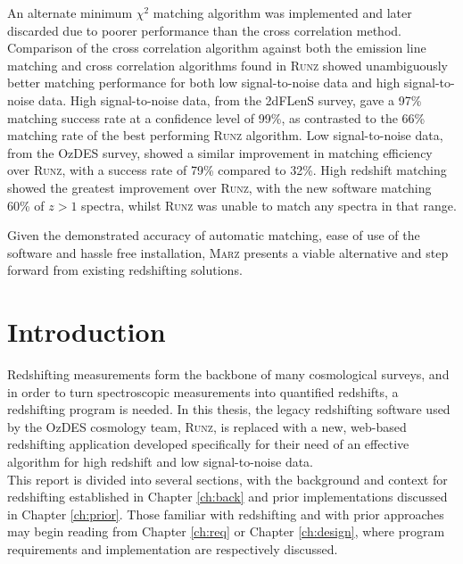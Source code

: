 \documentclass[titlesmallcaps, examinerscopy, copyrightpage]{uqthesis}
\newcommand{\thesisname}{\textsc{Marz}}
\newcommand{\runz}{\textsc{Runz}}
\begin{document}
An alternate minimum $\chi^2$ matching algorithm was implemented and later discarded due to poorer performance than the cross correlation method. Comparison of the cross correlation algorithm against both the emission line matching and cross correlation algorithms found in \runz{} showed unambiguously better matching performance for both low signal-to-noise data and high signal-to-noise data. High signal-to-noise data, from the 2dFLenS survey, gave a 97\% matching success rate at a confidence level of 99\%, as contrasted to the 66\% matching rate of the best performing \runz{} algorithm. Low signal-to-noise data, from the OzDES survey, showed a similar improvement in matching efficiency over \runz{}, with a success rate of 79\% compared to 32\%. High redshift matching showed the greatest improvement over \runz{}, with the new software matching 60\% of $z>1$ spectra, whilst \runz{} was unable to match any spectra in that range.

Given the demonstrated accuracy of automatic matching, ease of use of the software and hassle free installation, \thesisname{} presents a viable alternative and step forward from existing redshifting solutions.
\cleardoublepage
\hypersetup{pageanchor=true}

\tableofcontents
\listoffigures
\listoftables


\mainmatter


\chapter{Introduction}

Redshifting measurements form the backbone of many cosmological surveys, and in order to turn spectroscopic measurements into quantified redshifts, a redshifting program is needed. In this thesis, the legacy redshifting software used by the OzDES cosmology team, \runz{}, is replaced with a new, web-based redshifting application developed specifically for their need of an effective algorithm for high redshift and low signal-to-noise data.\\

This report is divided into several sections, with the background and context for redshifting established in Chapter \ref{ch:back} and prior implementations discussed in Chapter \ref{ch:prior}. Those familiar with redshifting and with prior approaches may begin reading from Chapter \ref{ch:req} or Chapter \ref{ch:design}, where program requirements and implementation are respectively discussed.
\end{document}
